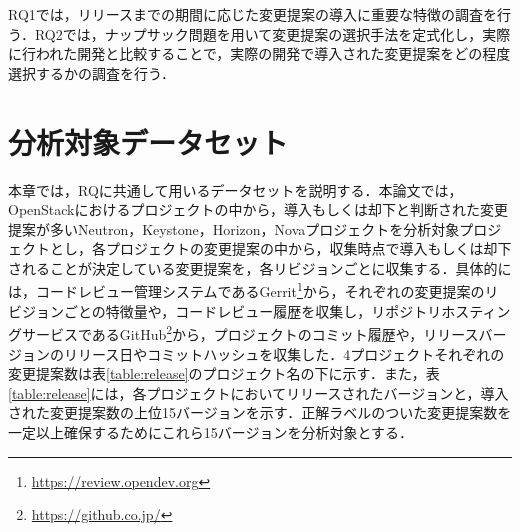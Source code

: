 \documentclass[submit,ses,noauthor]{ipsj}
\begin{document}
 RQ1では，リリースまでの期間に応じた変更提案の導入に重要な特徴の調査を行う．RQ2では，ナップサック問題を用いて変更提案の選択手法を定式化し，実際に行われた開発と比較することで，実際の開発で導入された変更提案をどの程度選択するかの調査を行う．
 
 
\section{分析対象データセット}\label{chap:dataset}

本章では，RQに共通して用いるデータセットを説明する．本論文では，OpenStackにおけるプロジェクトの中から，導入もしくは却下と判断された変更提案が多いNeutron，Keystone，Horizon，Novaプロジェクトを分析対象プロジェクトとし，各プロジェクトの変更提案の中から，収集時点で導入もしくは却下されることが決定している変更提案を，各リビジョンごとに収集する．具体的には，コードレビュー管理システムであるGerrit\footnote{\url{https://review.opendev.org}}から，それぞれの変更提案のリビジョンごとの特徴量や，コードレビュー履歴を収集し，リポジトリホスティングサービスであるGitHub\footnote{\url{https://github.co.jp/}}から，プロジェクトのコミット履歴や，リリースバージョンのリリース日やコミットハッシュを収集した．4プロジェクトそれぞれの変更提案数は表\ref{table:release}のプロジェクト名の下に示す．また，表\ref{table:release}には，各プロジェクトにおいてリリースされたバージョンと，導入された変更提案数の上位15バージョンを示す．正解ラベルのついた変更提案数を一定以上確保するためにこれら15バージョンを分析対象とする．

\end{document}
